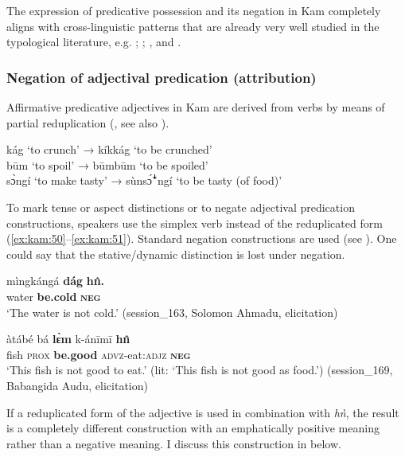\documentclass[output=paper,colorlinks,citecolor=brown]{langscibook}
\begin{document}
The expression of predicative possession and its negation in Kam completely aligns with cross-linguistic patterns that are already very well studied in the typological literature, e.g. \citet{Stassen2009}; \citet{Heine1997}; \citet{KutevaEtAl2019}, and \citet{Veselinova2013neg.exist}.

\subsubsection{Negation of adjectival predication (attribution)}\label{sec:kam:2.3.3}

Affirmative predicative adjectives in Kam are derived from verbs by means of partial reduplication (, see also \citealt[264--265]{Lesage2020}).

\ea\label{ex:kam:49}
kág ‘to crunch’ \tab → kíkkág ‘to be crunched’\\
būm ‘to spoil’ \tab → būmbūm ‘to be spoiled’\\
sɔ̀ngí ‘to make tasty’ \tab → sùnsɔ́ꜜngí ‘to be tasty (of food)’ \\ 
\z 

To mark tense or aspect distinctions or to negate adjectival predication constructions, speakers use the simplex verb instead of the reduplicated form (\ref{ex:kam:50}--\ref{ex:kam:51}). Standard negation constructions are used (see ). One could say that the stative/dynamic distinction is lost under negation.

\ea\label{ex:kam:50} 
    \gll mìngkángá \textbf{dág} \textbf{h\^{n}.}\\
        water \textbf{be.cold} \textbf{\textsc{neg}}\\
    \glt ‘The water is not cold.’ (session\_163, Solomon Ahmadu, elicitation)
\z 

\ea\label{ex:kam:51} 
    \gll àtábé bá \textbf{lɛ̀m} k-ánīmī \textbf{h\^{n}}\\
        fish \textsc{prox} \textbf{be.good} \textsc{advz}{}-eat:\textsc{adjz} \textbf{\textsc{neg}}\\
    \glt ‘This fish is not good to eat.’ (lit: ‘This fish is not good as food.’) (session\_169, Babangida Audu, elicitation)
\z 

If a reduplicated form of the adjective is used in combination with \textit{hǹ}, the result is a completely different construction with an emphatically positive meaning rather than a negative meaning. I discuss this construction in  below.
\end{document}
